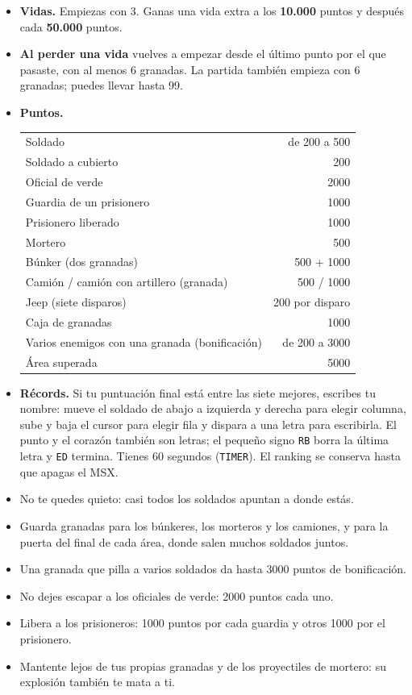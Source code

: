 \begin{itemize}
\item \textbf{Vidas.} Empiezas con 3. Ganas una vida extra a los \textbf{10.000} puntos y después cada \textbf{50.000} puntos.
\item \textbf{Al perder una vida} vuelves a empezar desde el último punto por el que pasaste, con al menos 6 granadas. La
partida también empieza con 6 granadas; puedes llevar hasta 99.
\item \begin{minipage}[t]{\linewidth}\textbf{Puntos.}
\begin{center}
\begin{tabular}{@{}lr@{}}
\toprule
Soldado & de 200 a 500\\
Soldado a cubierto & 200\\
Oficial de verde & 2000\\
Guardia de un prisionero & 1000\\
Prisionero liberado & 1000\\
Mortero & 500\\
Búnker (dos granadas) & 500 + 1000\\
Camión / camión con artillero (granada) & 500 / 1000\\
Jeep (siete disparos) & 200 por disparo\\
Caja de granadas & 1000\\
Varios enemigos con una granada (bonificación) & de 200 a 3000\\
Área superada & 5000\\
\bottomrule
\end{tabular}
\end{center}\end{minipage}
\item \textbf{Récords.} Si tu puntuación final está entre las siete mejores, escribes tu nombre: mueve el soldado de abajo a
izquierda y derecha para elegir columna, sube y baja el cursor para elegir fila y dispara a una letra para escribirla. El
punto y el corazón también son letras; el pequeño signo \texttt{RB} borra la última letra y \texttt{ED} termina. Tienes 60
segundos (\texttt{TIMER}). El ranking se conserva hasta que apagas el MSX.
\end{itemize}


\begin{itemize}
\item No te quedes quieto: casi todos los soldados apuntan a donde estás.
\item Guarda granadas para los búnkeres, los morteros y los camiones, y para la puerta del final de cada área, donde salen
muchos soldados juntos.
\item Una granada que pilla a varios soldados da hasta 3000 puntos de bonificación.
\item No dejes escapar a los oficiales de verde: 2000 puntos cada uno.
\item Libera a los prisioneros: 1000 puntos por cada guardia y otros 1000 por el prisionero.
\item Mantente lejos de tus propias granadas y de los proyectiles de mortero: su explosión también te mata a ti.
\end{itemize}
